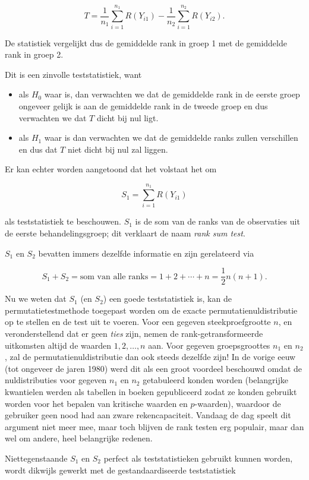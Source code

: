 \documentclass[
  12pt,dutch,coursenotes]{book}
\theoremstyle{definition}
\theoremstyle{definition}
\theoremstyle{definition}
\theoremstyle{remark}
\begin{document}
\[
  T = \frac{1}{n_1}\sum_{i=1}^{n_1} R(Y_{i1}) - \frac{1}{n_2}\sum_{i=1}^{n_2} R(Y_{i2}) .
\]

De statistiek vergelijkt dus de gemiddelde rank in groep 1 met de gemiddelde rank in groep 2.

Dit is een zinvolle teststatistiek, want

\begin{itemize}
\item
  als \(H_0\) waar is, dan verwachten we dat de gemiddelde rank in de eerste groep ongeveer gelijk is aan de gemiddelde rank in de tweede groep en dus verwachten we dat \(T\) dicht bij nul ligt.
\item
  als \(H_1\) waar is dan verwachten we dat de gemiddelde ranks zullen verschillen en dus dat \(T\) niet dicht bij nul zal liggen.
\end{itemize}

Er kan echter worden aangetoond dat het volstaat het om

\[S_1=\sum_{i=1}^{n_1} R(Y_{i1})\]

als teststatistiek te beschouwen. \(S_1\) is de som van de ranks van de observaties uit de eerste behandelingsgroep; dit verklaart de naam \emph{rank sum test}.

\(S_1\) en \(S_2\) bevatten immers dezelfde informatie en zijn gerelateerd via

\[
  S_1+S_2 = \text{som van alle ranks} = 1+2+\cdots + n=\frac{1}{2}n(n+1).
\]

Nu we weten dat \(S_1\) (en \(S_2\)) een goede teststatistiek is, kan de permutatietestmethode toegepast worden om de exacte permutatienuldistributie op te stellen en de test uit te voeren.
Voor een gegeven steekproefgrootte \(n\), en veronderstellend dat er geen \emph{ties} zijn, nemen de rank-getransformeerde uitkomsten altijd de waarden \(1, 2, \ldots, n\) aan. Voor gegeven groepsgroottes \(n_1\) en \(n_2\), zal de permutatienuldistributie dan ook steeds dezelfde zijn! In de vorige eeuw (tot ongeveer de jaren 1980) werd dit als een groot voordeel beschouwd omdat de nuldistributies voor gegeven \(n_1\) en \(n_2\) getabuleerd konden worden (belangrijke kwantielen werden als tabellen in boeken gepubliceerd zodat ze konden gebruikt worden voor het bepalen van kritische waarden en \(p\)-waarden), waardoor de gebruiker geen nood had aan zware rekencapaciteit. Vandaag de dag speelt dit argument niet meer mee, maar toch blijven de rank testen erg populair, maar dan wel om andere, heel belangrijke redenen.

Niettegenstaande \(S_1\) en \(S_2\) perfect als teststatistieken gebruikt kunnen worden, wordt dikwijls gewerkt met de gestandaardiseerde teststatistiek
\end{document}

